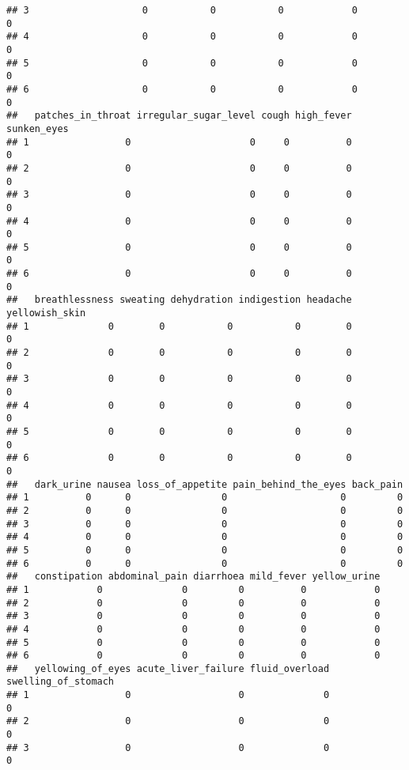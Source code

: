 \documentclass[
]{article}
\begin{document}
\begin{verbatim}
## 3                    0           0           0            0        0
## 4                    0           0           0            0        0
## 5                    0           0           0            0        0
## 6                    0           0           0            0        0
##   patches_in_throat irregular_sugar_level cough high_fever sunken_eyes
## 1                 0                     0     0          0           0
## 2                 0                     0     0          0           0
## 3                 0                     0     0          0           0
## 4                 0                     0     0          0           0
## 5                 0                     0     0          0           0
## 6                 0                     0     0          0           0
##   breathlessness sweating dehydration indigestion headache yellowish_skin
## 1              0        0           0           0        0              0
## 2              0        0           0           0        0              0
## 3              0        0           0           0        0              0
## 4              0        0           0           0        0              0
## 5              0        0           0           0        0              0
## 6              0        0           0           0        0              0
##   dark_urine nausea loss_of_appetite pain_behind_the_eyes back_pain
## 1          0      0                0                    0         0
## 2          0      0                0                    0         0
## 3          0      0                0                    0         0
## 4          0      0                0                    0         0
## 5          0      0                0                    0         0
## 6          0      0                0                    0         0
##   constipation abdominal_pain diarrhoea mild_fever yellow_urine
## 1            0              0         0          0            0
## 2            0              0         0          0            0
## 3            0              0         0          0            0
## 4            0              0         0          0            0
## 5            0              0         0          0            0
## 6            0              0         0          0            0
##   yellowing_of_eyes acute_liver_failure fluid_overload swelling_of_stomach
## 1                 0                   0              0                   0
## 2                 0                   0              0                   0
## 3                 0                   0              0                   0

\end{verbatim}
\end{document}
